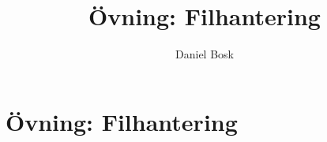 \documentclass[a4paper,10pt,oneside,openright,
               oldfontcommands]{memoir}
\begin{document}
\title{%
  Övning: Filhantering
}
\author{Daniel Bosk}

\maketitle

\begin{abstract}
  
\end{abstract}

\clearpage

\tableofcontents*

\chapter{Övning: Filhantering}



\appendix


\printbibliography
\end{document}
